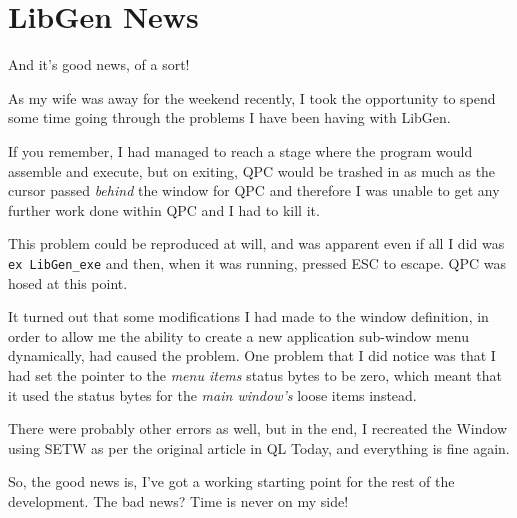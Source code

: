 \chapter{LibGen News}

And it's good news, of a sort!

As my wife was away for the weekend recently, I took the opportunity to spend some time going through the problems I  have been having with LibGen. 

If you remember, I had managed to reach a stage where the program would assemble and execute, but on exiting, QPC would be trashed in as much as the cursor passed \emph{behind} the window for QPC and therefore I was unable to get any further work done within QPC and I had to kill it.

This problem could be reproduced at will, and was apparent even if all I did was \texttt{ex LibGen\_exe} and then, when it was running, pressed ESC to escape. QPC was hosed at this point.

It turned out that some modifications I had made to the window definition, in order to allow me the ability to create a new application sub-window menu dynamically, had caused the problem. One problem that I did notice was that I had set the pointer to the \emph{menu items} status bytes to be zero, which meant that it used the status bytes for the \emph{main window's} loose items instead. 

There were probably other errors as well, but in the end, I recreated the Window using SETW as per the original article in QL Today, and everything is fine again.

So, the good news is, I've got a working starting point for the rest of the development. The bad news? Time is never on my side!

